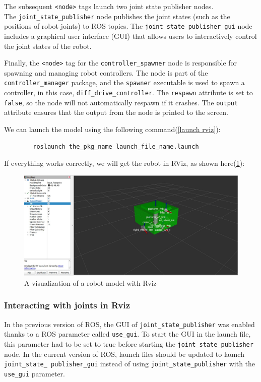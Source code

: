 \documentclass[../../main]{subfiles}
\begin{document}
    The subsequent \texttt{<node>} tags launch two joint state publisher nodes.\\ The \texttt{joint\_state\_publisher} node publishes the joint states (such as the positions of robot joints) to ROS topics. The \texttt{joint\_state\_publisher\_gui} node includes a graphical user interface (GUI) that allows users to interactively control the joint states of the robot.
    
    Finally, the \texttt{<node>} tag for the \texttt{controller\_spawner} node is responsible for spawning and managing robot controllers. The node is part of the \texttt{controller\_manager} package, and the \texttt{spawner} executable is used to spawn a controller, in this case, \texttt{diff\_drive\_controller}. The \texttt{respawn} attribute is set to \texttt{false}, so the node will not automatically respawn if it crashes. The \texttt{output} attribute ensures that the output from the node is printed to the screen.
    
    We can launch the model using the following command(\cref{launch rviz}):
    \begin{codebox}[label=launch rviz]{}
      \begin{verbatim}
        roslaunch the_pkg_name launch_file_name.launch
      \end{verbatim}
      \end{codebox}
    If everything works correctly, we will get the robot in RViz, as shown
    here(\cref{A visualization of a robot model with Rviz}):
    \begin{figure}[h!]
        \centering
        \includegraphics[width=\textwidth]{img/roborRvz1.jpg}
        \caption{A visualization of a robot model with Rviz}
\label{A visualization of a robot model with Rviz}
    \end{figure}
    \newpage
\subsubsection{Interacting with joints in Rviz}
In the previous version of ROS, the GUI of \texttt{joint\_state\_publisher} was enabled
thanks to a ROS parameter called \texttt{use\_gui}. To start the GUI in the launch file, this
parameter had to be set to true before starting the \texttt{joint\_state\_publisher} node.
In the current version of ROS, launch files should be updated to launch \texttt{joint\_state\_
publisher\_gui} instead of using \texttt{joint\_state\_publisher} with the \texttt{use\_gui}
parameter.
\end{document}
